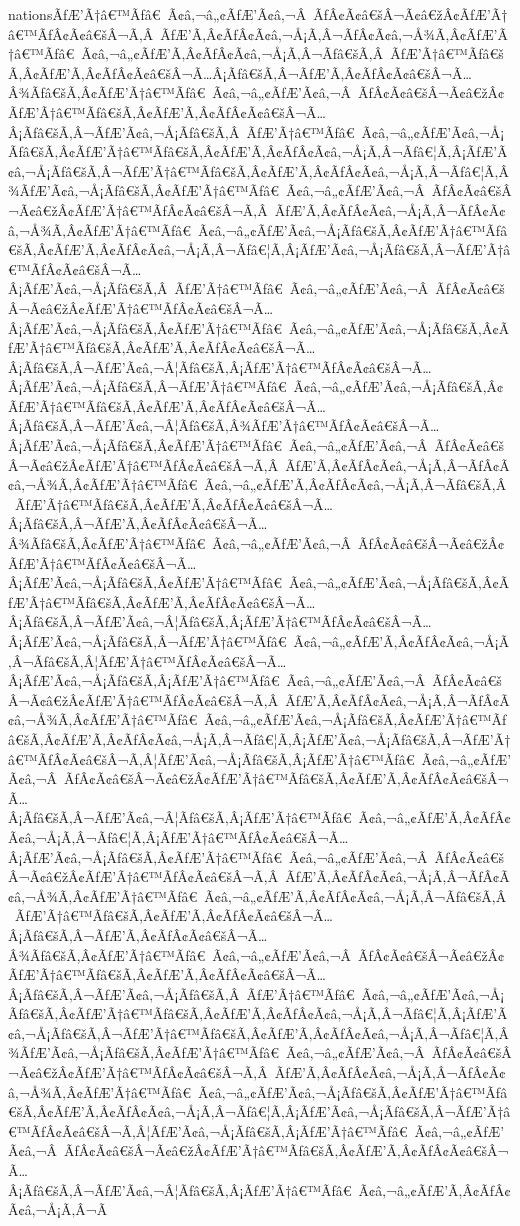\documentclass{article}
\begin{document}
\begin{outline}[enumerate]
nationsÃƒÆ’Ã†â€™Ãƒâ€ Ã¢â‚¬â„¢ÃƒÆ’Ã¢â‚¬Â ÃƒÂ¢Ã¢â€šÂ¬Ã¢â€žÂ¢ÃƒÆ’Ã†â€™ÃƒÂ¢Ã¢â€šÂ¬Ã‚Â ÃƒÆ’Ã‚Â¢ÃƒÂ¢Ã¢â‚¬Å¡Ã‚Â¬ÃƒÂ¢Ã¢â‚¬Å¾Ã‚Â¢ÃƒÆ’Ã†â€™Ãƒâ€ Ã¢â‚¬â„¢ÃƒÆ’Ã‚Â¢ÃƒÂ¢Ã¢â‚¬Å¡Ã‚Â¬Ãƒâ€šÃ‚Â ÃƒÆ’Ã†â€™Ãƒâ€šÃ‚Â¢ÃƒÆ’Ã‚Â¢ÃƒÂ¢Ã¢â€šÂ¬Ã…Â¡Ãƒâ€šÃ‚Â¬ÃƒÆ’Ã‚Â¢ÃƒÂ¢Ã¢â€šÂ¬Ã…Â¾Ãƒâ€šÃ‚Â¢ÃƒÆ’Ã†â€™Ãƒâ€ Ã¢â‚¬â„¢ÃƒÆ’Ã¢â‚¬Â ÃƒÂ¢Ã¢â€šÂ¬Ã¢â€žÂ¢ÃƒÆ’Ã†â€™Ãƒâ€šÃ‚Â¢ÃƒÆ’Ã‚Â¢ÃƒÂ¢Ã¢â€šÂ¬Ã…Â¡Ãƒâ€šÃ‚Â¬ÃƒÆ’Ã¢â‚¬Å¡Ãƒâ€šÃ‚Â ÃƒÆ’Ã†â€™Ãƒâ€ Ã¢â‚¬â„¢ÃƒÆ’Ã¢â‚¬Å¡Ãƒâ€šÃ‚Â¢ÃƒÆ’Ã†â€™Ãƒâ€šÃ‚Â¢ÃƒÆ’Ã‚Â¢ÃƒÂ¢Ã¢â‚¬Å¡Ã‚Â¬Ãƒâ€¦Ã‚Â¡ÃƒÆ’Ã¢â‚¬Å¡Ãƒâ€šÃ‚Â¬ÃƒÆ’Ã†â€™Ãƒâ€šÃ‚Â¢ÃƒÆ’Ã‚Â¢ÃƒÂ¢Ã¢â‚¬Å¡Ã‚Â¬Ãƒâ€¦Ã‚Â¾ÃƒÆ’Ã¢â‚¬Å¡Ãƒâ€šÃ‚Â¢ÃƒÆ’Ã†â€™Ãƒâ€ Ã¢â‚¬â„¢ÃƒÆ’Ã¢â‚¬Â ÃƒÂ¢Ã¢â€šÂ¬Ã¢â€žÂ¢ÃƒÆ’Ã†â€™ÃƒÂ¢Ã¢â€šÂ¬Ã‚Â ÃƒÆ’Ã‚Â¢ÃƒÂ¢Ã¢â‚¬Å¡Ã‚Â¬ÃƒÂ¢Ã¢â‚¬Å¾Ã‚Â¢ÃƒÆ’Ã†â€™Ãƒâ€ Ã¢â‚¬â„¢ÃƒÆ’Ã¢â‚¬Å¡Ãƒâ€šÃ‚Â¢ÃƒÆ’Ã†â€™Ãƒâ€šÃ‚Â¢ÃƒÆ’Ã‚Â¢ÃƒÂ¢Ã¢â‚¬Å¡Ã‚Â¬Ãƒâ€¦Ã‚Â¡ÃƒÆ’Ã¢â‚¬Å¡Ãƒâ€šÃ‚Â¬ÃƒÆ’Ã†â€™ÃƒÂ¢Ã¢â€šÂ¬Ã…Â¡ÃƒÆ’Ã¢â‚¬Å¡Ãƒâ€šÃ‚Â ÃƒÆ’Ã†â€™Ãƒâ€ Ã¢â‚¬â„¢ÃƒÆ’Ã¢â‚¬Â ÃƒÂ¢Ã¢â€šÂ¬Ã¢â€žÂ¢ÃƒÆ’Ã†â€™ÃƒÂ¢Ã¢â€šÂ¬Ã…Â¡ÃƒÆ’Ã¢â‚¬Å¡Ãƒâ€šÃ‚Â¢ÃƒÆ’Ã†â€™Ãƒâ€ Ã¢â‚¬â„¢ÃƒÆ’Ã¢â‚¬Å¡Ãƒâ€šÃ‚Â¢ÃƒÆ’Ã†â€™Ãƒâ€šÃ‚Â¢ÃƒÆ’Ã‚Â¢ÃƒÂ¢Ã¢â€šÂ¬Ã…Â¡Ãƒâ€šÃ‚Â¬ÃƒÆ’Ã¢â‚¬Â¦Ãƒâ€šÃ‚Â¡ÃƒÆ’Ã†â€™ÃƒÂ¢Ã¢â€šÂ¬Ã…Â¡ÃƒÆ’Ã¢â‚¬Å¡Ãƒâ€šÃ‚Â¬ÃƒÆ’Ã†â€™Ãƒâ€ Ã¢â‚¬â„¢ÃƒÆ’Ã¢â‚¬Å¡Ãƒâ€šÃ‚Â¢ÃƒÆ’Ã†â€™Ãƒâ€šÃ‚Â¢ÃƒÆ’Ã‚Â¢ÃƒÂ¢Ã¢â€šÂ¬Ã…Â¡Ãƒâ€šÃ‚Â¬ÃƒÆ’Ã¢â‚¬Â¦Ãƒâ€šÃ‚Â¾ÃƒÆ’Ã†â€™ÃƒÂ¢Ã¢â€šÂ¬Ã…Â¡ÃƒÆ’Ã¢â‚¬Å¡Ãƒâ€šÃ‚Â¢ÃƒÆ’Ã†â€™Ãƒâ€ Ã¢â‚¬â„¢ÃƒÆ’Ã¢â‚¬Â ÃƒÂ¢Ã¢â€šÂ¬Ã¢â€žÂ¢ÃƒÆ’Ã†â€™ÃƒÂ¢Ã¢â€šÂ¬Ã‚Â ÃƒÆ’Ã‚Â¢ÃƒÂ¢Ã¢â‚¬Å¡Ã‚Â¬ÃƒÂ¢Ã¢â‚¬Å¾Ã‚Â¢ÃƒÆ’Ã†â€™Ãƒâ€ Ã¢â‚¬â„¢ÃƒÆ’Ã‚Â¢ÃƒÂ¢Ã¢â‚¬Å¡Ã‚Â¬Ãƒâ€šÃ‚Â ÃƒÆ’Ã†â€™Ãƒâ€šÃ‚Â¢ÃƒÆ’Ã‚Â¢ÃƒÂ¢Ã¢â€šÂ¬Ã…Â¡Ãƒâ€šÃ‚Â¬ÃƒÆ’Ã‚Â¢ÃƒÂ¢Ã¢â€šÂ¬Ã…Â¾Ãƒâ€šÃ‚Â¢ÃƒÆ’Ã†â€™Ãƒâ€ Ã¢â‚¬â„¢ÃƒÆ’Ã¢â‚¬Â ÃƒÂ¢Ã¢â€šÂ¬Ã¢â€žÂ¢ÃƒÆ’Ã†â€™ÃƒÂ¢Ã¢â€šÂ¬Ã…Â¡ÃƒÆ’Ã¢â‚¬Å¡Ãƒâ€šÃ‚Â¢ÃƒÆ’Ã†â€™Ãƒâ€ Ã¢â‚¬â„¢ÃƒÆ’Ã¢â‚¬Å¡Ãƒâ€šÃ‚Â¢ÃƒÆ’Ã†â€™Ãƒâ€šÃ‚Â¢ÃƒÆ’Ã‚Â¢ÃƒÂ¢Ã¢â€šÂ¬Ã…Â¡Ãƒâ€šÃ‚Â¬ÃƒÆ’Ã¢â‚¬Â¦Ãƒâ€šÃ‚Â¡ÃƒÆ’Ã†â€™ÃƒÂ¢Ã¢â€šÂ¬Ã…Â¡ÃƒÆ’Ã¢â‚¬Å¡Ãƒâ€šÃ‚Â¬ÃƒÆ’Ã†â€™Ãƒâ€ Ã¢â‚¬â„¢ÃƒÆ’Ã‚Â¢ÃƒÂ¢Ã¢â‚¬Å¡Ã‚Â¬Ãƒâ€šÃ‚Â¦ÃƒÆ’Ã†â€™ÃƒÂ¢Ã¢â€šÂ¬Ã…Â¡ÃƒÆ’Ã¢â‚¬Å¡Ãƒâ€šÃ‚Â¡ÃƒÆ’Ã†â€™Ãƒâ€ Ã¢â‚¬â„¢ÃƒÆ’Ã¢â‚¬Â ÃƒÂ¢Ã¢â€šÂ¬Ã¢â€žÂ¢ÃƒÆ’Ã†â€™ÃƒÂ¢Ã¢â€šÂ¬Ã‚Â ÃƒÆ’Ã‚Â¢ÃƒÂ¢Ã¢â‚¬Å¡Ã‚Â¬ÃƒÂ¢Ã¢â‚¬Å¾Ã‚Â¢ÃƒÆ’Ã†â€™Ãƒâ€ Ã¢â‚¬â„¢ÃƒÆ’Ã¢â‚¬Å¡Ãƒâ€šÃ‚Â¢ÃƒÆ’Ã†â€™Ãƒâ€šÃ‚Â¢ÃƒÆ’Ã‚Â¢ÃƒÂ¢Ã¢â‚¬Å¡Ã‚Â¬Ãƒâ€¦Ã‚Â¡ÃƒÆ’Ã¢â‚¬Å¡Ãƒâ€šÃ‚Â¬ÃƒÆ’Ã†â€™ÃƒÂ¢Ã¢â€šÂ¬Ã‚Â¦ÃƒÆ’Ã¢â‚¬Å¡Ãƒâ€šÃ‚Â¡ÃƒÆ’Ã†â€™Ãƒâ€ Ã¢â‚¬â„¢ÃƒÆ’Ã¢â‚¬Â ÃƒÂ¢Ã¢â€šÂ¬Ã¢â€žÂ¢ÃƒÆ’Ã†â€™Ãƒâ€šÃ‚Â¢ÃƒÆ’Ã‚Â¢ÃƒÂ¢Ã¢â€šÂ¬Ã…Â¡Ãƒâ€šÃ‚Â¬ÃƒÆ’Ã¢â‚¬Â¦Ãƒâ€šÃ‚Â¡ÃƒÆ’Ã†â€™Ãƒâ€ Ã¢â‚¬â„¢ÃƒÆ’Ã‚Â¢ÃƒÂ¢Ã¢â‚¬Å¡Ã‚Â¬Ãƒâ€¦Ã‚Â¡ÃƒÆ’Ã†â€™ÃƒÂ¢Ã¢â€šÂ¬Ã…Â¡ÃƒÆ’Ã¢â‚¬Å¡Ãƒâ€šÃ‚Â¢ÃƒÆ’Ã†â€™Ãƒâ€ Ã¢â‚¬â„¢ÃƒÆ’Ã¢â‚¬Â ÃƒÂ¢Ã¢â€šÂ¬Ã¢â€žÂ¢ÃƒÆ’Ã†â€™ÃƒÂ¢Ã¢â€šÂ¬Ã‚Â ÃƒÆ’Ã‚Â¢ÃƒÂ¢Ã¢â‚¬Å¡Ã‚Â¬ÃƒÂ¢Ã¢â‚¬Å¾Ã‚Â¢ÃƒÆ’Ã†â€™Ãƒâ€ Ã¢â‚¬â„¢ÃƒÆ’Ã‚Â¢ÃƒÂ¢Ã¢â‚¬Å¡Ã‚Â¬Ãƒâ€šÃ‚Â ÃƒÆ’Ã†â€™Ãƒâ€šÃ‚Â¢ÃƒÆ’Ã‚Â¢ÃƒÂ¢Ã¢â€šÂ¬Ã…Â¡Ãƒâ€šÃ‚Â¬ÃƒÆ’Ã‚Â¢ÃƒÂ¢Ã¢â€šÂ¬Ã…Â¾Ãƒâ€šÃ‚Â¢ÃƒÆ’Ã†â€™Ãƒâ€ Ã¢â‚¬â„¢ÃƒÆ’Ã¢â‚¬Â ÃƒÂ¢Ã¢â€šÂ¬Ã¢â€žÂ¢ÃƒÆ’Ã†â€™Ãƒâ€šÃ‚Â¢ÃƒÆ’Ã‚Â¢ÃƒÂ¢Ã¢â€šÂ¬Ã…Â¡Ãƒâ€šÃ‚Â¬ÃƒÆ’Ã¢â‚¬Å¡Ãƒâ€šÃ‚Â ÃƒÆ’Ã†â€™Ãƒâ€ Ã¢â‚¬â„¢ÃƒÆ’Ã¢â‚¬Å¡Ãƒâ€šÃ‚Â¢ÃƒÆ’Ã†â€™Ãƒâ€šÃ‚Â¢ÃƒÆ’Ã‚Â¢ÃƒÂ¢Ã¢â‚¬Å¡Ã‚Â¬Ãƒâ€¦Ã‚Â¡ÃƒÆ’Ã¢â‚¬Å¡Ãƒâ€šÃ‚Â¬ÃƒÆ’Ã†â€™Ãƒâ€šÃ‚Â¢ÃƒÆ’Ã‚Â¢ÃƒÂ¢Ã¢â‚¬Å¡Ã‚Â¬Ãƒâ€¦Ã‚Â¾ÃƒÆ’Ã¢â‚¬Å¡Ãƒâ€šÃ‚Â¢ÃƒÆ’Ã†â€™Ãƒâ€ Ã¢â‚¬â„¢ÃƒÆ’Ã¢â‚¬Â ÃƒÂ¢Ã¢â€šÂ¬Ã¢â€žÂ¢ÃƒÆ’Ã†â€™ÃƒÂ¢Ã¢â€šÂ¬Ã‚Â ÃƒÆ’Ã‚Â¢ÃƒÂ¢Ã¢â‚¬Å¡Ã‚Â¬ÃƒÂ¢Ã¢â‚¬Å¾Ã‚Â¢ÃƒÆ’Ã†â€™Ãƒâ€ Ã¢â‚¬â„¢ÃƒÆ’Ã¢â‚¬Å¡Ãƒâ€šÃ‚Â¢ÃƒÆ’Ã†â€™Ãƒâ€šÃ‚Â¢ÃƒÆ’Ã‚Â¢ÃƒÂ¢Ã¢â‚¬Å¡Ã‚Â¬Ãƒâ€¦Ã‚Â¡ÃƒÆ’Ã¢â‚¬Å¡Ãƒâ€šÃ‚Â¬ÃƒÆ’Ã†â€™ÃƒÂ¢Ã¢â€šÂ¬Ã‚Â¦ÃƒÆ’Ã¢â‚¬Å¡Ãƒâ€šÃ‚Â¡ÃƒÆ’Ã†â€™Ãƒâ€ Ã¢â‚¬â„¢ÃƒÆ’Ã¢â‚¬Â ÃƒÂ¢Ã¢â€šÂ¬Ã¢â€žÂ¢ÃƒÆ’Ã†â€™Ãƒâ€šÃ‚Â¢ÃƒÆ’Ã‚Â¢ÃƒÂ¢Ã¢â€šÂ¬Ã…Â¡Ãƒâ€šÃ‚Â¬ÃƒÆ’Ã¢â‚¬Â¦Ãƒâ€šÃ‚Â¡ÃƒÆ’Ã†â€™Ãƒâ€ Ã¢â‚¬â„¢ÃƒÆ’Ã‚Â¢ÃƒÂ¢Ã¢â‚¬Å¡Ã‚Â¬Ã
\end{outline}
\end{document}

